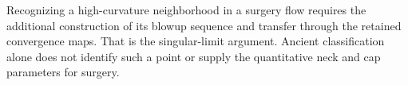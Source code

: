 Recognizing a high-curvature neighborhood in a surgery flow requires
the additional construction of its blowup sequence and transfer
through the retained convergence maps.  That is the singular-limit
argument.  Ancient classification alone does not identify such a
point or supply the quantitative neck and cap parameters for surgery.
